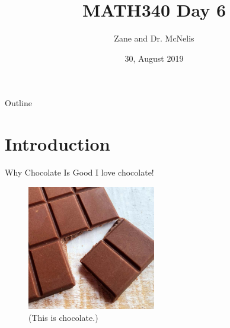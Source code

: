\documentclass{beamer} %
\title{MATH340 Day 6}
\author{Zane and Dr. McNelis}
\date{30, August 2019}
\begin{document}
\maketitle %

\begin{frame}{Outline}
    \tableofcontents %
\end{frame}

\section{Introduction}

\begin{frame}{Why Chocolate Is Good}
    I love chocolate!
    \begin{figure} %
        \centering
        \includegraphics[width=0.5\textwidth]{my_image.jpg}
        \caption{(This is chocolate.)}
        \label{fig:chocolate} %
    \end{figure}
\end{frame}
\end{document}
